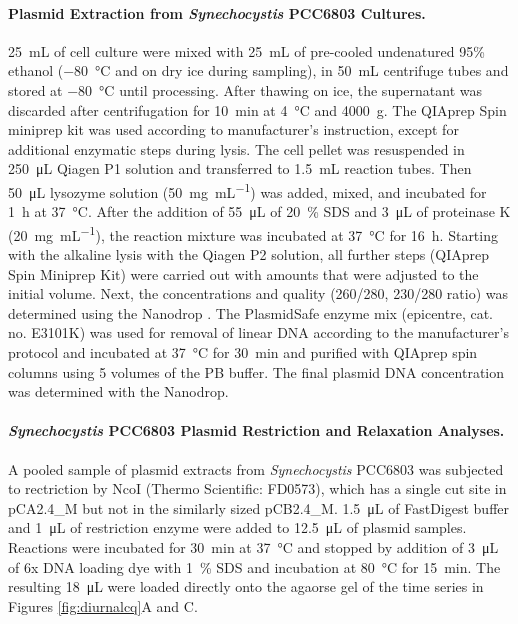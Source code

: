 \documentclass[10pt,a4]{article}
\newcommand{\mL}{\milli\liter}
\newcommand{\scyst}{\textit{Synechocystis} PCC6803}
\begin{document}
\paragraph{Plasmid Extraction from \scyst{} Cultures.}
\SI{25}{\mL} of cell culture were mixed with \SI{25}{\mL} of
pre-cooled undenatured 95\% ethanol (\SI{-80}{\celsius} and on dry ice
during sampling), in \SI{50}{\mL} centrifuge tubes and stored at
\SI{-80}{\celsius} until processing. After thawing on ice, the
supernatant was discarded after centrifugation for \SI{10}{\minute} at
\SI{4}{\celsius} and \SI{4000}{g}. The QIAprep Spin miniprep kit was
used according to manufacturer's instruction, except for additional
enzymatic steps during lysis. The cell pellet was resuspended in
\SI{250}{\micro\liter} Qiagen P1 solution and transferred to
\SI{1.5}{\mL} reaction tubes. Then \SI{50}{\micro\liter} lysozyme 
solution (\SI{50}{\milli\gram\per\milli\liter}) was added, mixed, and
incubated for \SI{1}{\hour} at \SI{37}{\celsius}.  After the addition
of \SI{55}{\micro\liter} of \SI{20}{\percent} SDS and
\SI{3}{\micro\liter} of proteinase K
(\SI{20}{\milli\gram\per\milli\liter}), the reaction mixture was
incubated at \SI{37}{\celsius} for \SI{16}{\hour}.  Starting with the
alkaline lysis with the Qiagen P2 solution, all further steps
(QIAprep Spin Miniprep Kit) were carried out with
amounts that were adjusted to the initial volume. Next, the
concentrations and quality (260/280, 230/280 ratio) was determined
using the Nanodrop  .  The PlasmidSafe enzyme mix (epicentre,
cat. no. E3101K) was used for removal of linear DNA according to the
manufacturer's protocol and incubated at \SI{37}{\celsius} for
\SI{30}{\minute} and purified with QIAprep spin columns using 5
volumes of the PB buffer. The final plasmid DNA concentration was
determined with the Nanodrop.


\paragraph{\scyst{} Plasmid Restriction and Relaxation Analyses.}
A pooled sample of plasmid extracts from \scyst{} was subjected to
rectriction by NcoI (Thermo Scientific: FD0573), which has a single
cut site in pCA2.4\_M but not in the similarly sized pCB2.4\_M.
\SI{1.5}{\uL} of FastDigest buffer and \SI{1}{\uL} of restriction
enzyme were added to \SI{12.5}{\uL} of plasmid samples. Reactions were
incubated for \SI{30}{\minute} at \SI{37}{\celsius} and stopped by
addition of \SI{3}{\uL} of 6x DNA loading dye with \SI{1}{\percent}
SDS and incubation at \SI{80}{\celsius} for \SI{15}{\minute}. The
resulting \SI{18}{\uL} were loaded directly onto the agaorse gel of
the time series in Figures \ref{fig:diurnalcq}A and C.
\end{document}
